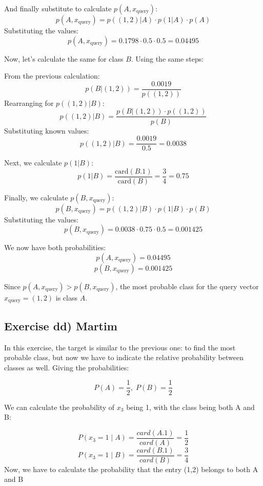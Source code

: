 \documentclass{article}
\begin{document}
And finally substitute to calculate \( p(A, x_\text{query}) \):
\[
p(A, x_\text{query}) = p((1,2) | A) \cdot p(1 | A) \cdot p(A)
\]
Substituting the values:
\[
p(A, x_\text{query}) = 0.1798 \cdot 0.5 \cdot 0.5 = 0.04495
\]

\bigskip

Now, let’s calculate the same for class \( B \). Using the same steps:

From the previous calculation:
\[
p(B | (1,2)) = \frac{0.0019}{p((1,2))}
\]
Rearranging for \( p((1,2) | B) \):
\[
p((1,2) | B) = \frac{p(B | (1,2)) \cdot p((1,2))}{p(B)}
\]
Substituting known values:
\[
p((1,2) | B) = \frac{0.0019}{0.5} = 0.0038
\]

Next, we calculate \( p(1 | B) \):
\[
p(1 | B) = \frac{\text{card}(B.1)}{\text{card}(B)} = \frac{3}{4} = 0.75
\]

Finally, we calculate \( p(B, x_\text{query}) \):
\[
p(B, x_\text{query}) = p((1,2) | B) \cdot p(1 | B) \cdot p(B)
\]
Substituting the values:
\[
p(B, x_\text{query}) = 0.0038 \cdot 0.75 \cdot 0.5 = 0.001425
\]

\bigskip

We now have both probabilities:
\[
p(A, x_\text{query}) = 0.04495
\]
\[
p(B, x_\text{query}) = 0.001425
\]

Since \( p(A, x_\text{query}) > p(B, x_\text{query}) \), the most probable class for the query vector \( x_\text{query} = (1,2) \) is class \( A \).



\subsection{Exercise dd) Martim}
In this exercise, the target is similar to the previous one: to find the most probable class, but now we have to indicate the relative probability between classes as well.
\newline
\newline
Giving the probabilities:

\[
P(A) = \frac{1}{2},\;P(B) = \frac{1}{2}
\]

We can calculate the probability of \( x_3 \) being 1, with the class being both A and B:

\[
P(x_3 = 1 \mid A) = \frac{card(A.1)}{card(A)} = \frac{1}{2}
\]
\[
P(x_3 = 1 \mid B) = \frac{card(B.1)}{card(B)} = \frac{3}{4}
\]
\newline
Now, we have to calculate the probability that the entry (1,2) belongs to both A and B
\end{document}
